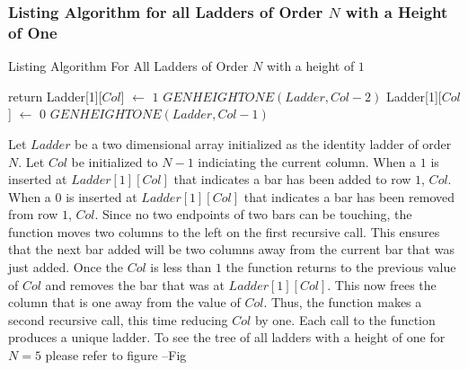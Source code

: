    \subsubsection{Listing Algorithm for all Ladders of Order $N$ with a Height of One}
   \begin{algorithm}
        \caption{Listing Algorithm For All Ladders of Order $N$ with a height of $1$}
        \begin{algorithmic}[1]
                    \State return
                \EndIf
                \State Ladder[1][$Col$] $\gets$ $1$
                \State $GENHEIGHTONE(Ladder, Col-2)$
                \State Ladder[1][$Col$] $\gets$ $0$
                \State $GENHEIGHTONE(Ladder, Col-1)$


            \EndFunction
        \end{algorithmic}    
   \end{algorithm}

   Let $Ladder$ be a two dimensional array initialized as the identity ladder of order $N$. Let $Col$ be initialized to $N-1$ indiciating the 
   current column. When a $1$ is inserted at $Ladder[1][Col]$ that indicates a bar has been added to row $1$, $Col$. When a $0$ is 
   inserted at $Ladder[1][Col]$ that indicates a bar has been removed from row $1$, $Col$. Since no two endpoints of two bars can be touching, 
   the function moves two columns to the 
   left on the first recursive call. This ensures that the next bar added will be two columns away from the current bar that was just added. 
   Once the $Col$ is less than $1$ the function returns to the previous value of $Col$ and removes the bar that was at $Ladder[1][Col]$. 
   This now frees the column that is one away from the  value of $Col$. Thus, the function makes a second recursive call, this time reducing $Col$ by one. 
   Each call to the function produces a unique ladder. To see the tree of all ladders with a height of one for $N=5$ please refer to figure --Fig\pagebreak

